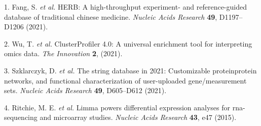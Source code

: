 \documentclass[
]{article}
\newenvironment{cslreferences}%
  {}%
  {\par}
\begin{document}
\hypertarget{refs}{}
\begin{cslreferences}
\leavevmode\hypertarget{ref-HerbAHighThFang2021}{}%
1. Fang, S. \emph{et al.} HERB: A high-throughput experiment- and reference-guided database of traditional chinese medicine. \emph{Nucleic Acids Research} \textbf{49}, D1197--D1206 (2021).

\leavevmode\hypertarget{ref-ClusterprofilerWuTi2021}{}%
2. Wu, T. \emph{et al.} ClusterProfiler 4.0: A universal enrichment tool for interpreting omics data. \emph{The Innovation} \textbf{2}, (2021).

\leavevmode\hypertarget{ref-TheStringDataSzklar2021}{}%
3. Szklarczyk, D. \emph{et al.} The string database in 2021: Customizable proteinprotein networks, and functional characterization of user-uploaded gene/measurement sets. \emph{Nucleic Acids Research} \textbf{49}, D605--D612 (2021).

\leavevmode\hypertarget{ref-LimmaPowersDiRitchi2015}{}%
4. Ritchie, M. E. \emph{et al.} Limma powers differential expression analyses for rna-sequencing and microarray studies. \emph{Nucleic Acids Research} \textbf{43}, e47 (2015).
\end{cslreferences}
\end{document}
